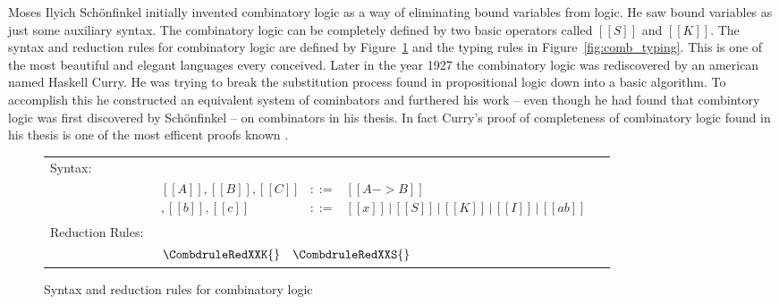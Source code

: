 Moses Ilyich Sch\"onfinkel initially invented combinatory logic as a
way of eliminating bound variables from logic.  He saw bound variables
as just some auxiliary syntax.  The combinatory logic can be
completely defined by two basic operators called $[[S]]$ and $[[K]]$.
The syntax and reduction rules for combinatory logic are defined by
Figure~\ref{fig:comb_syntax} and the typing rules in
Figure~\ref{fig:comb_typing}.  
This is one of the most beautiful and elegant languages every
conceived.  Later in the year 1927 the combinatory logic was
rediscovered by an american named Haskell Curry.  He was trying to
break the substitution process found in propositional logic down into
a basic algorithm.  To accomplish this he constructed an equivalent
system of cominbators and furthered his work -- even though he had
found that combintory logic was first discovered by Sch\"onfinkel --
on combinators in his thesis. In fact Curry's proof of completeness of
combinatory logic found in his thesis is one of the most efficent
proofs known \cite{Cardone:2006}.
\begin{figure}
  \begin{center}
    \begin{tabular}{lll}
      Syntax: & \\
      & 
      \begin{math}
        \begin{array}{lll}
          [[A]],[[B]],[[C]] & ::= & [[A -> B]]\\
          [[a]],[[b]],[[c]] & ::= & [[x]]\,|\,[[S]]\,|\,[[K]]\,|\,[[I]]\,|\,[[a b]]
        \end{array}
      \end{math}
      & \\
      Reduction Rules: & \\
      & 
      \begin{math}
        \begin{array}{lll}
          \CombdruleRedXXK{} & \CombdruleRedXXS{}
        \end{array}
      \end{math}
    \end{tabular}
  \end{center}
  
  \caption{Syntax and reduction rules for combinatory logic}
  \label{fig:comb_syntax}
\end{figure}

